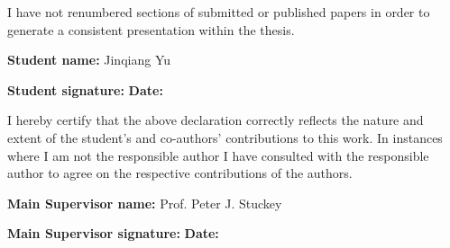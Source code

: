 I have not renumbered sections of submitted or published papers
in order to generate a consistent presentation within the thesis.

\textbf{Student name:} Jinqiang Yu

\textbf{Student signature:} \hspace{15em} \textbf{Date:}

I hereby certify that the above declaration correctly reflects the
nature and extent of the student's and co-authors' contributions to this
work. In instances where I am not the responsible author I have
consulted with the responsible author to agree on the respective
contributions of the authors.

\textbf{Main Supervisor name:} Prof. Peter J. Stuckey 

\textbf{Main Supervisor signature:} \hspace{10.5em} \textbf{Date:}


